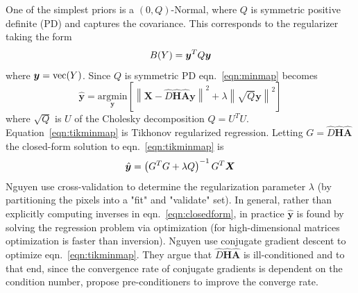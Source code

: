 One of the simplest priors is a $(0, Q)$-Normal, where $Q$ is symmetric positive definite (PD) and captures the covariance.
%
This corresponds to the regularizer taking the form
\begin{equation}
    B(Y) = \bm{y} ^T Q \bm{y}
\end{equation}
where $\bm{y} = \text{vec}(Y)$.
%
Since $Q$ is symmetric PD eqn.~\ref{eqn:minmap} becomes
\begin{equation}
    \hat{\bm{y}} = \underset{\bm{y}}{\text{argmin}}\left[ \left\| \bm{X} - \hat{D} \hat{\bm{H}} \hat{\bm{A}} \bm{y} \right\|^2 +\lambda \left\| \sqrt{Q}\bm{y} \right\|^2 \right]
    \label{eqn:tikminmap}
\end{equation}
where $\sqrt{Q}$ is $U$ of the Cholesky decomposition $Q = U^T U$.
%
Equation~\ref{eqn:tikminmap} is Tikhonov regularized regression.
%
Letting $G = \hat{D} \hat{\bm{H}} \hat{\bm{A}}$ the closed-form solution to eqn.~\ref{eqn:tikminmap} is
\begin{equation}
    \hat{\by} = \left( G^T G + \lambda Q \right)^{-1} G^T\bX
    \label{eqn:closedform}
\end{equation}
Nguyen \etal\cite{milanfar2001} use cross-validation to determine the regularization parameter $\lambda$ (by partitioning the pixels into a "fit" and "validate" set).
%
In general, rather than explicitly computing inverses in eqn.~\ref{eqn:closedform}, in practice $\hat{\bm{y}}$ is found by solving the regression problem via optimization (for high-dimensional matrices optimization is faster than inversion).
%
Nguyen \etal use conjugate gradient descent to optimize eqn.~\ref{eqn:tikminmap}.
%
They argue that $\hat{D} \hat{\bm{H}} \hat{\bm{A}}$ is ill-conditioned and to that end, since the convergence rate of conjugate gradients is dependent on the condition number\cite{vanderSluis1986}, propose pre-conditioners to improve the converge rate.

